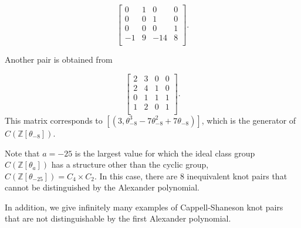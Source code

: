 \documentclass[12pt]{amsart}
\theoremstyle{plain}
\theoremstyle{definition}
\theoremstyle{remark}
\renewcommand{\(}{\big(}
\renewcommand{\)}{\big)}
\theoremstyle{plain}
\theoremstyle{definition}
\begin{document}
    \[
        \begin{bmatrix}
        0 & 1 & 0 & 0\\
        0 & 0 & 1 & 0\\
        0 & 0 & 0 & 1\\
        -1 & 9 & -14 & 8\\    
        \end{bmatrix}.
    \]

    Another pair is obtained from 

    \[
        \begin{bmatrix}
        2 & 3 & 0 & 0\\
        2 & 4 & 1 & 0\\
        0 & 1 & 1 & 1\\
        1 & 2 & 0 & 1\\    
        \end{bmatrix}.
    \]
    This matrix corresponds to $[(3, \theta_{-8}^3 -7 \theta_{-8}^2 +7 \theta_{-8})]$, which is the generator of $C(\mathbb{Z}[\theta_{-8}])$. 
    
    Note that $a=-25$ is the largest value for which the ideal class group $C(\mathbb{Z}[\theta_a])$ has a structure other than the cyclic group, $C(\mathbb{Z}[\theta_{-25}])=C_4\times C_2$. In this case, there are $8$ inequivalent knot pairs that cannot be distinguished by the Alexander polynomial.

    In addition, we give infinitely many examples of Cappell-Shaneson knot pairs that are not distinguishable by the first Alexander polynomial.
\end{document}
